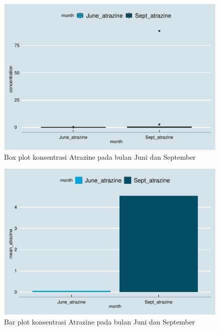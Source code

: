 \documentclass[]{book}
\newenvironment{Shaded}{\begin{snugshade}}{\end{snugshade}}
\newcommand{\KeywordTok}[1]{\textcolor[rgb]{0.13,0.29,0.53}{\textbf{#1}}}
\newcommand{\DataTypeTok}[1]{\textcolor[rgb]{0.13,0.29,0.53}{#1}}
\newcommand{\StringTok}[1]{\textcolor[rgb]{0.31,0.60,0.02}{#1}}
\newcommand{\OtherTok}[1]{\textcolor[rgb]{0.56,0.35,0.01}{#1}}
\newcommand{\OperatorTok}[1]{\textcolor[rgb]{0.81,0.36,0.00}{\textbf{#1}}}
\newcommand{\NormalTok}[1]{#1}
\begin{document}
\begin{figure}

{\centering \includegraphics[width=0.7\linewidth]{EnvStat_files/figure-latex/bpgeda-1} 

}

\caption{Box plot konsentrasi Atrazine pada bulan Juni dan September}\label{fig:bpgeda}
\end{figure}

\begin{Shaded}
\end{Shaded}

\begin{figure}

{\centering \includegraphics[width=0.7\linewidth]{EnvStat_files/figure-latex/bargeda-1} 

}

\caption{Bar plot konsentrasi Atrazine pada bulan Juni dan September}\label{fig:bargeda}
\end{figure}
\end{document}

